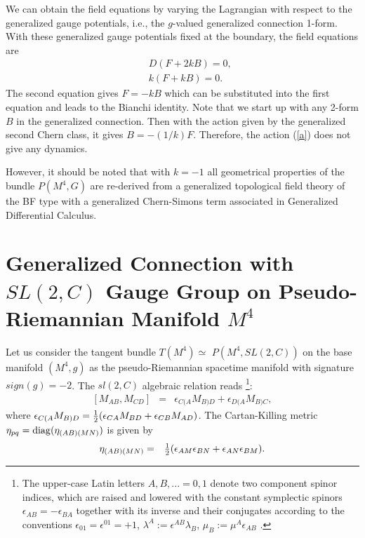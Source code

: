 \documentclass[a4paper,twocolumn,showpacs,prd]{revtex4}
\begin{document}
We can obtain the field equations by varying the
Lagrangian with respect to the generalized gauge
potentials, i.e., the $g$-valued generalized
connection
 1-form. With these generalized gauge
potentials fixed at the boundary, the field
equations are
\begin{eqnarray}
&& D(F + 2 k B) =0,\label{11} \\
&& k (F + k B)=0 .\label{12}
\end{eqnarray}
The second equation gives  $F=-k B$ which can
be substituted %
into the first equation and leads to the Bianchi identity. Note
that we start up with any 2-form $B$ in the generalized
connection. Then with the action given by the generalized second
Chern class, it gives $B=-(1/k) F$. Therefore, the action
(\ref{a}) does not give any dynamics.

However, it should be noted that with $k=-1$ all geometrical
properties of the bundle $P(M^4, G)$ are re-derived from a
generalized topological field theory of the BF type with a
generalized Chern-Simons term associated in Generalized
Differential Calculus.


\section{Generalized Connection with $SL(2,C)$ Gauge Group on
Pseudo-Riemannian Manifold $M^4$}

%
Let us consider the tangent bundle $T(M^4)\simeq $ $ P(M^4,
SL(2,C))$ on the base manifold $(M^4, g)$ as the pseudo-Riemannian
spacetime manifold with signature $sign(g)=-2$. The $sl(2,C)$
algebraic relation reads {\footnote{The upper-case Latin letters
$A,B,...=0,1$ denote two component spinor indices, which are
raised and lowered with the constant symplectic spinors
$\epsilon_{AB}=-\epsilon_{BA}$ together with its inverse and their
conjugates according to the conventions
$\epsilon_{01}=\epsilon^{01}=+1$,
$\lambda^A:=\epsilon^{AB}\lambda_B$, $\mu_B:=\mu^A\epsilon_{AB}$
\cite{PR}.}}:
\begin{eqnarray}
\left[ M_{AB}, M_{CD} \right] &=&
      \epsilon_{C(A} M_{B)D}
     +\epsilon_{D(A} M_{B)C} ,
\end{eqnarray}
where $\epsilon_{C(A} M_{B)D} =\textstyle{1\over2} (\epsilon_{CA}
M_{BD} +\epsilon_{CB} M_{AD})$. The Cartan-Killing metric
$\eta_{pq}={\rm{diag}}(\eta_{(AB)(MN)})$ is given by
\begin{eqnarray}
\eta_{(AB)(MN)}&=& \textstyle{1\over2}
(\epsilon_{AM}\epsilon_{BN}+\epsilon_{AN}\epsilon_{BM}).
\end{eqnarray}
\end{document}
